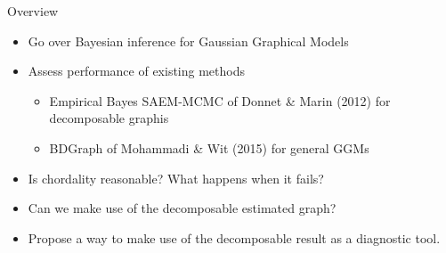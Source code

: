 \begin{frame}{Overview}
    \begin{itemize}
        \item Go over Bayesian inference for Gaussian Graphical Models
        \item Assess performance of existing methods
        \begin{itemize}
            \item Empirical Bayes SAEM-MCMC of Donnet \& Marin (2012) for decomposable graphis
            \item BDGraph of Mohammadi \& Wit (2015) for general GGMs
        \end{itemize}
        \item Is chordality reasonable? What happens when it fails?
        \item Can we make use of the decomposable estimated graph?
        \item Propose a way to make use of the decomposable result as a diagnostic tool.
    \end{itemize}
\end{frame}

